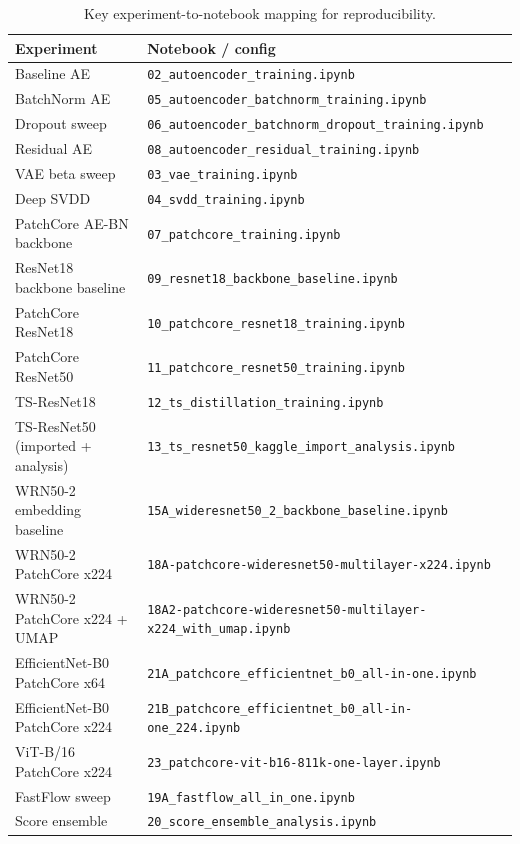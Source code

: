 \documentclass[11pt]{article}
\begin{document}
\begin{table}[H]
\centering
\caption{Key experiment-to-notebook mapping for reproducibility.}
\label{tab:appendix_notebooks}
\begin{tabularx}{\linewidth}{>{\raggedright\arraybackslash}X>{\raggedright\arraybackslash}X}
\toprule
Experiment & Notebook / config \\
\midrule
Baseline AE                       & \texttt{02\_autoencoder\_training.ipynb} \\
BatchNorm AE                      & \texttt{05\_autoencoder\_batchnorm\_training.ipynb} \\
Dropout sweep                     & \texttt{06\_autoencoder\_batchnorm\_dropout\_training.ipynb} \\
Residual AE                       & \texttt{08\_autoencoder\_residual\_training.ipynb} \\
VAE beta sweep                    & \texttt{03\_vae\_training.ipynb} \\
Deep SVDD                         & \texttt{04\_svdd\_training.ipynb} \\
PatchCore AE-BN backbone          & \texttt{07\_patchcore\_training.ipynb} \\
ResNet18 backbone baseline        & \texttt{09\_resnet18\_backbone\_baseline.ipynb} \\
PatchCore ResNet18                & \texttt{10\_patchcore\_resnet18\_training.ipynb} \\
PatchCore ResNet50                & \texttt{11\_patchcore\_resnet50\_training.ipynb} \\
TS-ResNet18                       & \texttt{12\_ts\_distillation\_training.ipynb} \\
TS-ResNet50 (imported + analysis) & \texttt{13\_ts\_resnet50\_kaggle\_import\_analysis.ipynb} \\
WRN50-2 embedding baseline        & \texttt{15A\_wideresnet50\_2\_backbone\_baseline.ipynb} \\
WRN50-2 PatchCore x224            & \texttt{18A-patchcore-wideresnet50-multilayer-x224.ipynb} \\
WRN50-2 PatchCore x224 + UMAP    & \texttt{18A2-patchcore-wideresnet50-multilayer-x224\_with\_umap.ipynb} \\
EfficientNet-B0 PatchCore x64     & \texttt{21A\_patchcore\_efficientnet\_b0\_all-in-one.ipynb} \\
EfficientNet-B0 PatchCore x224    & \texttt{21B\_patchcore\_efficientnet\_b0\_all-in-one\_224.ipynb} \\
ViT-B/16 PatchCore x224           & \texttt{23\_patchcore-vit-b16-811k-one-layer.ipynb} \\
FastFlow sweep                    & \texttt{19A\_fastflow\_all\_in\_one.ipynb} \\
Score ensemble                    & \texttt{20\_score\_ensemble\_analysis.ipynb} \\
\bottomrule
\end{tabularx}
\end{table}
\end{document}
